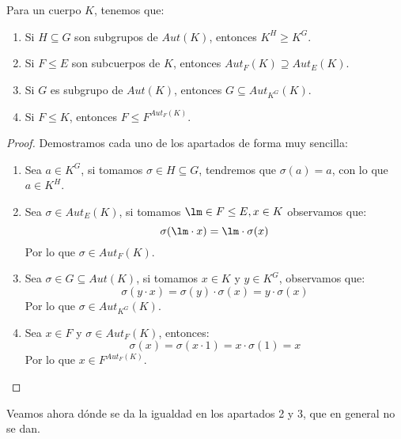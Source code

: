 \begin{lema}
    Para un cuerpo $K$, tenemos que:
    \begin{enumerate}
        \item Si $H\subseteq G$ son subgrupos de $Aut(K)$, entonces $K^H \geq K^G$. %
        \item Si $F\leq E$ son subcuerpos de $K$, entonces $Aut_F(K)\supseteq Aut_E(K)$.
        \item Si $G$ es subgrupo de $Aut(K)$, entonces $G\subseteq Aut_{K^G}(K)$.
        \item Si $F\leq K$, entonces $F\leq F^{Aut_F(K)}$.
    \end{enumerate}
    \begin{proof}
        Demostramos cada uno de los apartados de forma muy sencilla:
        \begin{enumerate}
            \item Sea $a\in K^G$, si tomamos $\sigma\in H\subseteq G$, tendremos que $\sigma(a) = a$, con lo que $a\in K^H$.
            \item Sea $\sigma\in Aut_E(K)$, si tomamos $\lm \in F\leq E, x\in K$ observamos que:
                \begin{equation*}
                    \sigma(\lm \cdot x) = \lm\cdot \sigma(x)
                \end{equation*}
                Por lo que $\sigma\in Aut_F(K)$.
            \item Sea $\sigma\in G\subseteq Aut(K)$, si tomamos $x\in K$ y $y\in K^G$, observamos que:
                \begin{equation*}
                    \sigma(y\cdot x) = \sigma(y)\cdot \sigma(x) = y\cdot \sigma(x)
                \end{equation*}
                Por lo que $\sigma\in Aut_{K^G}(K)$.
            \item Sea $x\in F$ y $\sigma \in Aut_F(K)$, entonces:
                \begin{equation*}
                    \sigma(x) = \sigma(x\cdot 1) = x\cdot \sigma(1) = x
                \end{equation*}
                Por lo que $x\in F^{Aut_F(K)}$.
        \end{enumerate}
    \end{proof}
\end{lema}

\noindent
Veamos ahora dónde se da la igualdad en los apartados 2 y 3, que en general no se dan.

